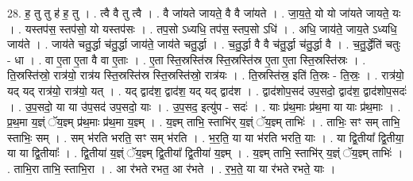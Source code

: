 \documentclass[17pt]{extarticle}
\begin{document}
28. ह॒ तु तु ह॑ ह॒ तु । . त्वै वै तु त्वै । . वै जा॑यते जायते॒ वै वै जा॑यते । . जा॒य॒ते॒ यो यो जा॑यते जायते॒ यः । . यस्तप॑स॒ स्तप॑सो॒ यो यस्तप॑सः । . तप॒सो ऽध्यधि॒ तप॑स॒ स्तप॒सो ऽधि॑ । . अधि॒ जाय॑ते॒ जाय॒ते ऽध्यधि॒ जाय॑ते । . जाय॑ते चतु॒र्द्धा च॑तु॒र्द्धा जाय॑ते॒ जाय॑ते चतु॒र्द्धा । . च॒तु॒र्द्धा वै वै च॑तु॒र्द्धा च॑तु॒र्द्धा वै । . च॒तु॒र्द्धेति॑ चतुः - धा । . वा ए॒ता ए॒ता वै वा ए॒ताः । . ए॒ता स्ति॒स्रस्ति॑स्र स्ति॒स्रस्ति॑स्र ए॒ता ए॒ता स्ति॒स्रस्ति॑स्रः । . ति॒स्रस्ति॑स्रो॒ रात्र॑यो॒ रात्र॑य स्ति॒स्रस्ति॑स्र स्ति॒स्रस्ति॑स्रो॒ रात्र॑यः । . ति॒स्रस्ति॑स्र॒ इति॑ ति॒स्रः - ति॒स्रः॒ । . रात्र॑यो॒ यद् यद् रात्र॑यो॒ रात्र॑यो॒ यत् । . यद् द्वाद॑श॒ द्वाद॑श॒ यद् यद् द्वाद॑श । . द्वाद॑शोप॒सद॑ उप॒सदो॒ द्वाद॑श॒ द्वाद॑शोप॒सदः॑ । . उ॒प॒सदो॒ या या उ॑प॒सद॑ उप॒सदो॒ याः । . उ॒प॒सद॒ इत्यु॑प - सदः॑ । . याः प्र॑थ॒माः प्र॑थ॒मा या याः प्र॑थ॒माः । . प्र॒थ॒मा य॒ज्ञ्ं ॅय॒ज्ञ्म् प्र॑थ॒माः प्र॑थ॒मा य॒ज्ञ्म् । . य॒ज्ञ्म् ताभि॒ स्ताभि॑र् य॒ज्ञ्ं ॅय॒ज्ञ्म् ताभिः॑ । . ताभिः॒ सꣳ सम् ताभि॒ स्ताभिः॒ सम् । . सम् भ॑रति भरति॒ सꣳ सम् भ॑रति । . भ॒र॒ति॒ या या भ॑रति भरति॒ याः । . या द्वि॒तीया᳚ द्वि॒तीया॒ या या द्वि॒तीयाः᳚ । . द्वि॒तीया॑ य॒ज्ञ्ं ॅय॒ज्ञ्म् द्वि॒तीया᳚ द्वि॒तीया॑ य॒ज्ञ्म् । . य॒ज्ञ्म् ताभि॒ स्ताभि॑र् य॒ज्ञ्ं ॅय॒ज्ञ्म् ताभिः॑ । . ताभि॒रा ताभि॒ स्ताभि॒रा । . आ र॑भते रभत॒ आ र॑भते । . र॒भ॒ते॒ या या र॑भते रभते॒ याः । \newline
\end{document}

